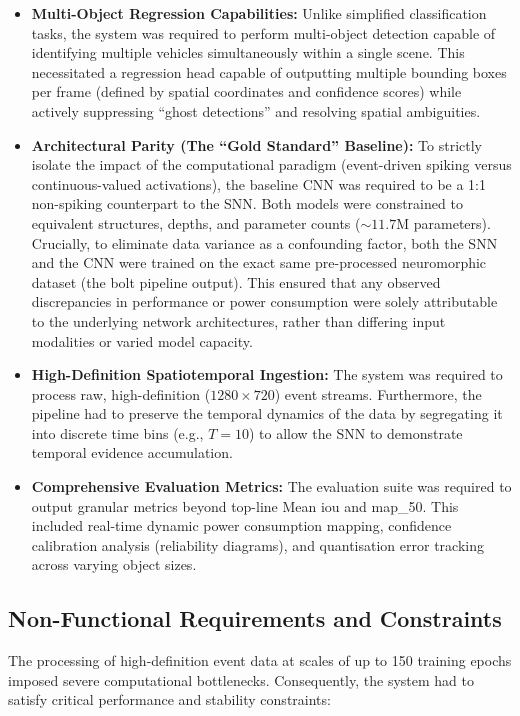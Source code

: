 \begin{itemize}
    \item \textbf{Multi-Object Regression Capabilities:} Unlike simplified classification tasks, the system was required to perform multi-object detection capable of identifying multiple vehicles simultaneously within a single scene. This necessitated a regression head capable of outputting multiple bounding boxes per frame (defined by spatial coordinates and confidence scores) while actively suppressing ``ghost detections'' and resolving spatial ambiguities.
    \item \textbf{Architectural Parity (The ``Gold Standard'' Baseline):} To strictly isolate the impact of the computational paradigm (event-driven spiking versus continuous-valued activations), the baseline CNN was required to be a 1:1 non-spiking counterpart to the SNN. Both models were constrained to equivalent structures, depths, and parameter counts ($\sim 11.7$M parameters). Crucially, to eliminate data variance as a confounding factor, both the SNN and the CNN were trained on the exact same pre-processed neuromorphic dataset (the \gls{bolt} pipeline output). This ensured that any observed discrepancies in performance or power consumption were solely attributable to the underlying network architectures, rather than differing input modalities or varied model capacity.
    \item \textbf{High-Definition Spatiotemporal Ingestion:} The system was required to process raw, high-definition ($1280 \times 720$) event streams. Furthermore, the pipeline had to preserve the temporal dynamics of the data by segregating it into discrete time bins (e.g., $T=10$) to allow the SNN to demonstrate temporal evidence accumulation.
    \item \textbf{Comprehensive Evaluation Metrics:} The evaluation suite was required to output granular metrics beyond top-line Mean \gls{iou} and \gls{map_50}. This included real-time dynamic power consumption mapping, confidence calibration analysis (reliability diagrams), and quantisation error tracking across varying object sizes.
\end{itemize}

\subsection{Non-Functional Requirements and Constraints}
\label{subsec:req_nonfunctional}

The processing of high-definition event data at scales of up to 150 training epochs imposed severe computational bottlenecks. Consequently, the system had to satisfy critical performance and stability constraints:

